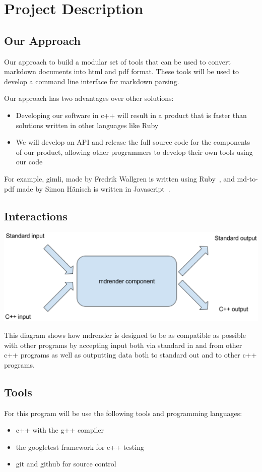 \section{Project Description}

\subsection{Our Approach}
Our approach to build a modular set of tools that can be used to convert markdown documents into html and pdf format. These tools will be used to develop a command line interface for markdown parsing.

Our approach has two advantages over other solutions:
\begin{itemize}
	\item Developing our software in c++ will result in a product that is faster than solutions written in other languages like Ruby
	\item We will develop an API and release the full source code for the components of our product, allowing other programmers to develop their own tools using our code
\end{itemize}
For example, gimli, made by Fredrik Wallgren is written using Ruby~\cite{gimli}, and md-to-pdf made by Simon Hänisch is written in Javascript~\cite{md-to-pdf}.

\subsection{Interactions}

\includegraphics[width=500pt]{images/mdrender_interactions.eps}

This diagram shows how mdrender is designed to be as compatible as possible with other programs by accepting input both via standard in and from other c++ programs as well as outputting data both to standard out and to other c++ programs.

\subsection{Tools}
For this program will be use the following tools and programming languages:
\begin{itemize}
	\item c++ with the g++ compiler
	\item the googletest framework for c++ testing
	\item git and github for source control
\end{itemize}

